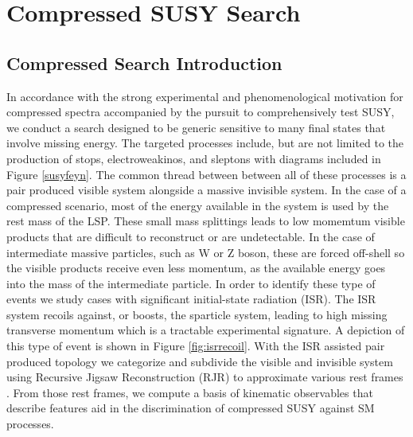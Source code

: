 
\setcounter{secnumdepth}{3}
\setcounter{tocdepth}{3}
\setlength{\parskip}{\smallskipamount}
\setlength{\parindent}{0pt}


\makeatletter


\providecommand{\tabularnewline}{\\}


\makeatother

%

\chapter{Compressed SUSY Search}


\section{Compressed Search Introduction}
In accordance with the strong experimental and phenomenological motivation for compressed spectra accompanied by the pursuit to comprehensively test SUSY, we conduct a search designed to be generic sensitive to many final states that involve missing energy. The targeted processes include, but are not limited to the production of stops, electroweakinos, and sleptons with diagrams included in Figure \ref{susyfeyn}.  
The common thread between between all of these processes is a pair produced visible system alongside a massive invisible system. In the case of a compressed scenario, most of the energy available in the system is used by the rest mass of the LSP. These small mass splittings leads to low momemtum visible products that are difficult to reconstruct or are undetectable. In the case of intermediate massive particles, such as W or Z boson, these are forced off-shell so the visible products receive even less momentum, as the available energy goes into the mass of the intermediate particle. In order to identify these type of events we study cases with significant initial-state radiation (ISR). The ISR system recoils against, or boosts, the sparticle system, leading to high missing transverse momentum which is a tractable experimental signature. A depiction of this type of event is shown in Figure \ref{fig:isrrecoil}. With the ISR assisted pair produced topology we categorize and subdivide the visible and invisible system using Recursive Jigsaw Reconstruction (RJR) to approximate various rest frames \cite{PhysRevD.96.112007}. From those rest frames, we compute a basis of kinematic observables that describe features aid in the discrimination of compressed SUSY against SM processes.

